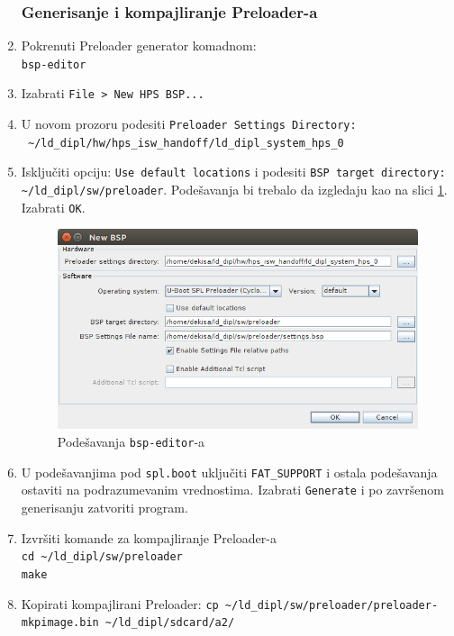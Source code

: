 \begin{enumerate}
\subsubsection{Generisanje i kompajliranje Preloader-a}
\item Pokrenuti Preloader generator komadnom:\\ \texttt{bsp-editor}
\item Izabrati \texttt{File > New HPS BSP...}
\item U novom prozoru podesiti \texttt{Preloader Settings Directory:} \\ \texttt{ \textasciitilde/ld\_dipl/hw/hps\_isw\_handoff/ld\_dipl\_system\_hps\_0}
\item Isključiti opciju: \texttt{Use default locations} i podesiti \texttt{BSP target directory:} \\ \texttt{\textasciitilde/ld\_dipl/sw/preloader}. Podešavanja bi trebalo da izgledaju kao na slici \ref{slika:bsp1}. Izabrati \texttt{OK}.
\begin{figure}[h!]
\centering
\includegraphics[scale=0.6]{img/bsp1.png}
\caption{Podešavanja \texttt{bsp-editor}-a}
\label{slika:bsp1}
\end{figure}
\item U podešavanjima pod \texttt{spl.boot} uključiti \texttt{FAT\_SUPPORT} i ostala podešavanja ostaviti na podrazumevanim vrednostima. Izabrati \texttt{Generate} i po završenom generisanju zatvoriti program.
\item Izvršiti komande za kompajliranje Preloader-a\\
\texttt{cd \textasciitilde/ld\_dipl/sw/preloader}\\
\texttt{make}
\item Kopirati kompajlirani Preloader:
\texttt{cp \textasciitilde/ld\_dipl/sw/preloader/preloader-mkpimage.bin \textasciitilde/ld\_dipl/sdcard/a2/}\\


\end{enumerate}
